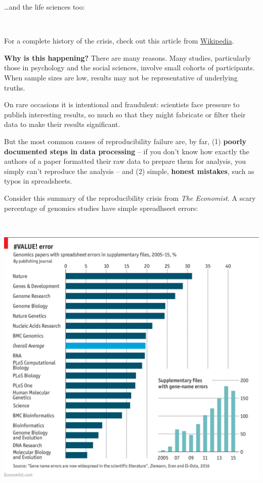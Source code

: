 \documentclass[
]{book}
\begin{document}
\ldots and the life sciences too:

~

For a complete history of the crisis, check out this article from \href{https://en.wikipedia.org/wiki/Replication_crisis}{Wikipedia}.

\textbf{Why is this happening?} There are many reasons. Many studies, particularly those in psychology and the social sciences, involve small cohorts of participants. When sample sizes are low, results may not be representative of underlying truths.

On rare occasions it is intentional and fraudulent: scientists face pressure to publish interesting results, so much so that they might fabricate or filter their data to make their results significant.

But the most common causes of reproducibility failure are, by far, (1) \textbf{poorly documented steps in data processing} -- if you don't know how exactly the authors of a paper formatted their raw data to prepare them for analysis, you simply can't reproduce the analysis -- and (2) simple, \textbf{honest mistakes}, such as typos in spreadsheets.

Consider this summary of the reproducibility crisis from \emph{The Economist}. A scary percentage of genomics studies have simple spreadhseet errors:

~

\includegraphics{img/reproducibility-economist.png}
~
\end{document}
